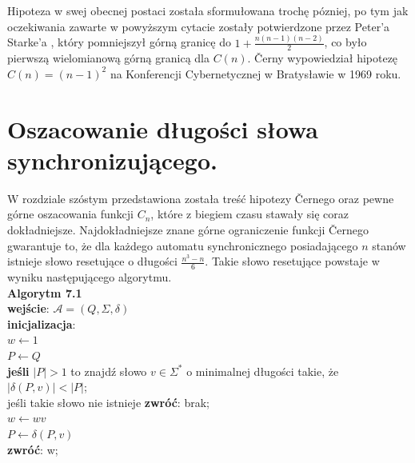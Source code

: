 \documentclass[12pt,a4paper]{article}
\begin{document}
Hipoteza w swej obecnej postaci zosta{\l}a sformu{\l}owana troch\k{e} p\'ozniej, po tym jak oczekiwania zawarte w powy\.zszym cytacie zosta{\l}y potwierdzone przez Peter'a Starke'a \cite{4}, kt\'ory pomniejszy{\l} g\'orn\k{a} granic\k{e} do $1+\frac{n(n-1)(n-2)}{2}$, co by{\l}o pierwsz\k{a} wielomianow\k{a} g\'orn\k{a} granic\k{a} dla $C(n)$. \v Cerny wypowiedzia{\l} hipotez\k{e} $C(n)=(n-1)^{2}$ na Konferencji Cybernetycznej  w Bratys{\l}awie w 1969 roku.


\section{Oszacowanie d{\l}ugo\'{s}ci s{\l}owa synchronizuj\k{a}cego.}

W rozdziale sz\'ostym przedstawiona zosta{\l}a tre\'s\'c hipotezy \v Cernego oraz pewne g\'orne oszacowania funkcji $C_{n}$, kt\'ore z  biegiem czasu stawa{\l}y si\k{e} coraz dok{\l}adniejsze. Najdok{\l}adniejsze znane g\'orne ograniczenie funkcji \v Cernego gwarantuje to, \.ze dla ka\.zdego automatu synchronicznego posiadaj\k{a}cego $n$ stan\'ow istnieje s{\l}owo resetuj\k{a}ce o d{\l}ugo\'sci $\frac{n^{3}-n}{6}$. Takie s{\l}owo resetuj\k{a}ce powstaje w wyniku nast\k{e}puj\k{a}cego algorytmu.\\


\textbf{Algorytm 7.1}\\ 
\textbf{wej\'scie}: $\mathscr{A}=(Q, \Sigma, \delta)$\\
\textbf{inicjalizacja}: \\
$w\leftarrow 1$\\ 
$P\leftarrow Q$\\
\textbf{je\'sli} $|P|>1$ to znajd\'z s{\l}owo $v\in\Sigma^{*}$ o minimalnej d{\l}ugo\'sci takie, \.ze $|\delta(P,v)|<|P|$;\\
je\'sli takie s{\l}owo nie istnieje \textbf{zwr\'o\'c}: brak;\\
$w\leftarrow wv$\\ 
$P\leftarrow \delta(P,v)$\\
\textbf{zwr\'o\'c}: w;\\
\end{document}
